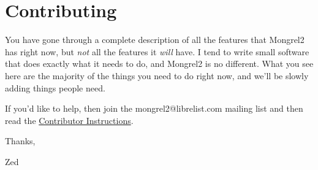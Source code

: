 \chapter{Contributing}

You have gone through a complete description of all the features that Mongrel2 has right now,
but \emph{not} all the features it \emph{will} have.  I tend to write small software that does
exactly what it needs to do, and Mongrel2 is no different.  What you see here are the
majority of the things you need to do right now, and we'll be slowly adding things
people need.

If you'd like to help, then join the mongrel2@librelist.com mailing list and then read the
\href{http://mongrel2.org/wiki/contributor_instructions.html}{Contributor Instructions}.

Thanks,

\indent Zed
